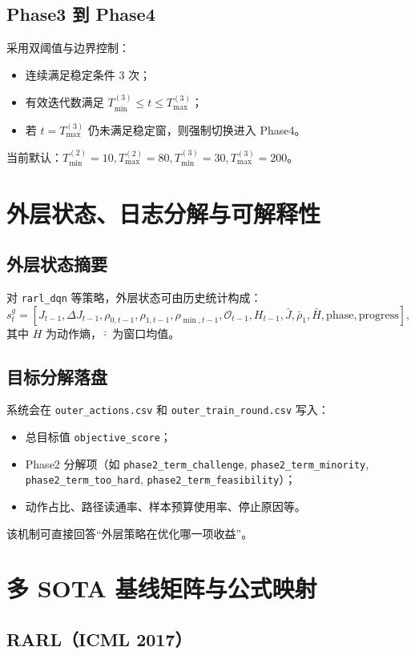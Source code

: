 \documentclass[UTF8,11pt,a4paper]{ctexart}
\begin{document}
\subsection{Phase3 到 Phase4}
采用双阈值与边界控制：
\begin{itemize}
\item 连续满足稳定条件 3 次；
\item 有效迭代数满足 \(T_{\min}^{(3)}\le t \le T_{\max}^{(3)}\)；
\item 若 \(t=T_{\max}^{(3)}\) 仍未满足稳定窗，则强制切换进入 Phase4。
\end{itemize}
当前默认：\(T_{\min}^{(2)}=10, T_{\max}^{(2)}=80, T_{\min}^{(3)}=30, T_{\max}^{(3)}=200\)。

\section{外层状态、日志分解与可解释性}
\subsection{外层状态摘要}
对 \texttt{rarl\_dqn} 等策略，外层状态可由历史统计构成：
\begin{equation}
s_t^g=[J_{t-1},\Delta J_{t-1},\rho_{0,t-1},\rho_{1,t-1},\rho_{\min,t-1},\mathcal{O}_{t-1},H_{t-1},\bar J,\bar \rho_1,\bar H,\mathrm{phase},\mathrm{progress}],
\end{equation}
其中 \(H\) 为动作熵，\(\bar{\cdot}\) 为窗口均值。

\subsection{目标分解落盘}
系统会在 \texttt{outer\_actions.csv} 和 \texttt{outer\_train\_round.csv} 写入：
\begin{itemize}
\item 总目标值 \texttt{objective\_score}；
\item Phase2 分解项（如 \texttt{phase2\_term\_challenge}, \texttt{phase2\_term\_minority}, \texttt{phase2\_term\_too\_hard}, \texttt{phase2\_term\_feasibility}）；
\item 动作占比、路径读通率、样本预算使用率、停止原因等。
\end{itemize}
该机制可直接回答“外层策略在优化哪一项收益”。

\section{多 SOTA 基线矩阵与公式映射}
\subsection{RARL（ICML 2017）}
\end{document}
